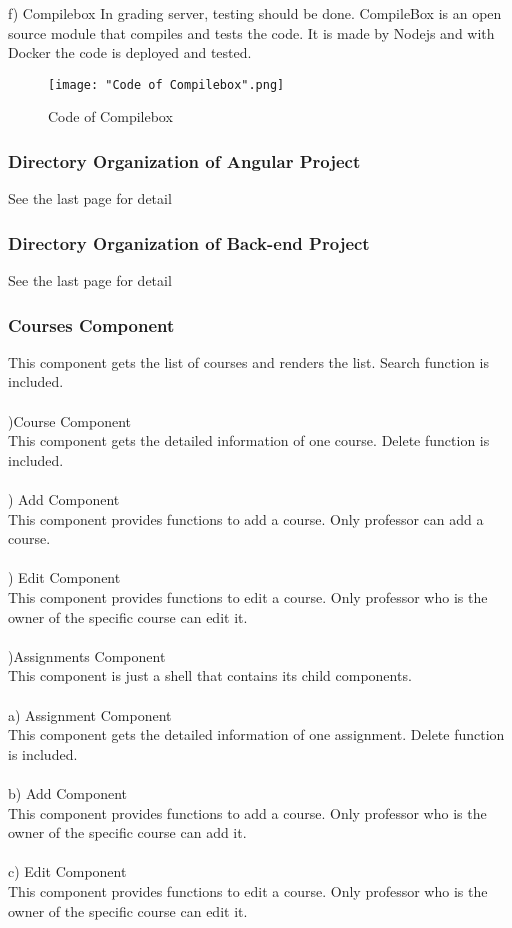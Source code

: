 \documentclass[10pt,journal,compsoc]{IEEEtran}
\begin{document}
\null\qquad f)	Compilebox
In grading server, testing should be done. CompileBox is an open source module that compiles and tests the code. It is made by Nodejs and with Docker the code is deployed and tested.
\begin{figure}[H]
\centering
\texttt{[image: "Code of Compilebox".png]}
{\caption*{Code of Compilebox}}
\end{figure}


\subsubsection{Directory Organization of Angular Project}
See the last page for detail

\subsubsection{Directory Organization of Back-end Project}
See the last page for detail
\subsubsection{Courses Component}
This component gets the list of courses and renders the list. Search function is included.\\\\
\null{})Course Component\\
This component gets the detailed information of one course. Delete function is included.\\\\
\null{})	Add Component\\
This component provides functions to add a course. Only professor can add a course.\\\\
\null{})	Edit Component\\
This component provides functions to edit a course. Only professor who is the owner of the specific course can edit it.\\\\
\null{})Assignments Component\\
This component is just a shell that contains its child components.\\\\
\null\qquad a)	Assignment Component\\
This component gets the detailed information of one assignment. Delete function is included.\\\\
\null\qquad b)	Add Component\\
This component provides functions to add a course. Only professor who is the owner of the specific course can add it.\\\\
\null\qquad c)	Edit Component\\
This component provides functions to edit a course. Only professor who is the owner of the specific course can edit it.\\\\
\end{document}
